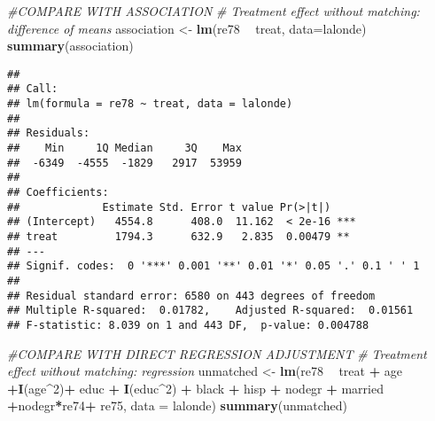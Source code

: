 \documentclass[]{article}
\newenvironment{Shaded}{\begin{snugshade}}{\end{snugshade}}
\newcommand{\CommentTok}[1]{\textcolor[rgb]{0.56,0.35,0.01}{\textit{#1}}}
\newcommand{\DataTypeTok}[1]{\textcolor[rgb]{0.13,0.29,0.53}{#1}}
\newcommand{\DecValTok}[1]{\textcolor[rgb]{0.00,0.00,0.81}{#1}}
\newcommand{\KeywordTok}[1]{\textcolor[rgb]{0.13,0.29,0.53}{\textbf{#1}}}
\newcommand{\NormalTok}[1]{#1}
\newcommand{\OperatorTok}[1]{\textcolor[rgb]{0.81,0.36,0.00}{\textbf{#1}}}
\newcommand{\StringTok}[1]{\textcolor[rgb]{0.31,0.60,0.02}{#1}}
\begin{document}
\begin{Shaded}
\begin{Highlighting}[]
\CommentTok{#COMPARE WITH ASSOCIATION}
\CommentTok{# Treatment effect without matching: difference of means}
\NormalTok{association <-}\StringTok{ }\KeywordTok{lm}\NormalTok{(re78 }\OperatorTok{~}\StringTok{ }\NormalTok{treat, }\DataTypeTok{data=}\NormalTok{lalonde)}
\KeywordTok{summary}\NormalTok{(association)}
\end{Highlighting}
\end{Shaded}

\begin{verbatim}
## 
## Call:
## lm(formula = re78 ~ treat, data = lalonde)
## 
## Residuals:
##    Min     1Q Median     3Q    Max 
##  -6349  -4555  -1829   2917  53959 
## 
## Coefficients:
##             Estimate Std. Error t value Pr(>|t|)    
## (Intercept)   4554.8      408.0  11.162  < 2e-16 ***
## treat         1794.3      632.9   2.835  0.00479 ** 
## ---
## Signif. codes:  0 '***' 0.001 '**' 0.01 '*' 0.05 '.' 0.1 ' ' 1
## 
## Residual standard error: 6580 on 443 degrees of freedom
## Multiple R-squared:  0.01782,    Adjusted R-squared:  0.01561 
## F-statistic: 8.039 on 1 and 443 DF,  p-value: 0.004788
\end{verbatim}

\begin{Shaded}
\begin{Highlighting}[]
\CommentTok{#COMPARE WITH DIRECT REGRESSION ADJUSTMENT}
\CommentTok{# Treatment effect without matching: regression}
\NormalTok{unmatched <-}\StringTok{ }\KeywordTok{lm}\NormalTok{(re78 }\OperatorTok{~}\StringTok{ }\NormalTok{treat }\OperatorTok{+}\StringTok{ }\NormalTok{age }\OperatorTok{+}\KeywordTok{I}\NormalTok{(age}\OperatorTok{^}\DecValTok{2}\NormalTok{)}\OperatorTok{+}\StringTok{ }\NormalTok{educ }\OperatorTok{+}\StringTok{ }\KeywordTok{I}\NormalTok{(educ}\OperatorTok{^}\DecValTok{2}\NormalTok{) }\OperatorTok{+}\StringTok{ }\NormalTok{black }\OperatorTok{+}\StringTok{ }\NormalTok{hisp }\OperatorTok{+}\StringTok{ }\NormalTok{nodegr }\OperatorTok{+}\StringTok{ }\NormalTok{married }\OperatorTok{+}\NormalTok{nodegr}\OperatorTok{*}\NormalTok{re74}\OperatorTok{+}\StringTok{ }\NormalTok{re75, }
                \DataTypeTok{data =}\NormalTok{ lalonde)}
\KeywordTok{summary}\NormalTok{(unmatched)}
\end{Highlighting}
\end{Shaded}
\end{document}

